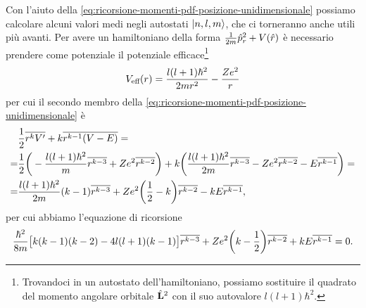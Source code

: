 Con l'aiuto della \eqref{eq:ricorsione-momenti-pdf-posizione-unidimensionale} possiamo calcolare alcuni valori medi negli autostati $\left|{n,l,m}\right\rangle$, che ci torneranno anche utili più avanti.
Per avere un hamiltoniano della forma $\frac1{2m}\hat{p}_r^2+V(\hat{r})$ è necessario prendere come potenziale il potenziale efficace\footnote{
	Trovandoci in un autostato dell'hamiltoniano, possiamo sostituire il quadrato del momento angolare orbitale $\hat{\mathbf{L}}^2$ con il suo autovalore $l(l+1)\hbar^2$.
}
\begin{equation}
	V_\textup{eff}(r)=\frac{l(l+1)\hbar^2}{2mr^2}-\frac{Ze^2}{r}
\end{equation}
per cui il secondo membro della \eqref{eq:ricorsione-momenti-pdf-posizione-unidimensionale} è
\begin{equation}
	\begin{split}
		&\frac12\overline{r^kV'}+k\overline{r^{k-1}(V-E)}=\\
		=&\frac12\bigg(-\frac{l(l+1)\hbar^2}{m}\overline{r^{k-3}}+Ze^2\overline{r^{k-2}}\bigg)+k\bigg(\frac{l(l+1)\hbar^2}{2m}\overline{r^{k-3}}-Ze^2\overline{r^{k-2}}-E\overline{r^{k-1}}\bigg)=\\
		=&\frac{l(l+1)\hbar^2}{2m}(k-1)\overline{r^{k-3}}+Ze^2\bigg(\frac12-k\bigg)\overline{r^{k-2}}-kE\overline{r^{k-1}},
	\end{split}
\end{equation}
per cui abbiamo l'equazione di ricorsione
\begin{equation}
	\frac{\hbar^2}{8m}\big[k(k-1)(k-2)-4l(l+1)(k-1)\big]\overline{r^{k-3}}+Ze^2\bigg(k-\frac12\bigg)\overline{r^{k-2}}+kE\overline{r^{k-1}}=0.
	\label{eq:ricorsione-momenti-pdf-radiale-atomo-idrogeno}
\end{equation}

